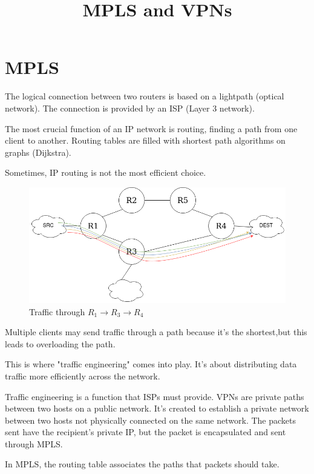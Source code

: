 \documentclass[12pt]{article}
\title{\textbf{MPLS and VPNs}}
\author{}
\date{}
\begin{document}
\maketitle

\section*{MPLS}

The logical connection between two routers is based on a lightpath (optical network).
The connection is provided by an ISP (Layer 3 network).

The most crucial function of an IP network is routing, finding a path from one client to another.
Routing tables are filled with shortest path algorithms on graphs (Dijkstra).

Sometimes, IP routing is not the most efficient choice. 

\begin{figure}[ht]
    \includegraphics[scale = 0.4]{Example1.png}
    \centering
    \caption[short]{Traffic through \(R_1 \rightarrow R_3 \rightarrow R_4\)}
\end{figure}

Multiple clients may send traffic through a path because it's the shortest,but this leads to overloading the path.

This is where "traffic engineering" comes into play. It's about distributing data traffic more efficiently across the network.

Traffic engineering is a function that ISPs must provide. VPNs are private paths between two hosts on a public network. It's created to establish a private network between two hosts not physically connected on the same network. The packets sent have the recipient's private IP, but the packet is encapsulated and sent through MPLS.

\newpage
In MPLS, the routing table associates the paths that packets should take.
\end{document}
